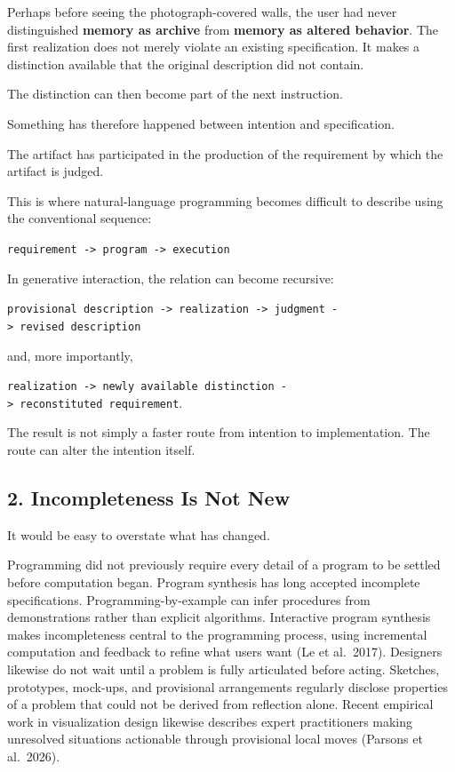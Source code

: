 \documentclass[
]{article}
\begin{document}
Perhaps before seeing the photograph-covered walls, the user had never
distinguished \textbf{memory as archive} from \textbf{memory as altered
behavior}. The first realization does not merely violate an existing
specification. It makes a distinction available that the original
description did not contain.

The distinction can then become part of the next instruction.

Something has therefore happened between intention and specification.

The artifact has participated in the production of the requirement by
which the artifact is judged.

This is where natural-language programming becomes difficult to describe
using the conventional sequence:

\texttt{requirement\ -\textgreater{}\ program\ -\textgreater{}\ execution}

In generative interaction, the relation can become recursive:

\texttt{provisional\ description\ -\textgreater{}\ realization\ -\textgreater{}\ judgment\ -\textgreater{}\ revised\ description}

and, more importantly,

\texttt{realization\ -\textgreater{}\ newly\ available\ distinction\ -\textgreater{}\ reconstituted\ requirement}.

The result is not simply a faster route from intention to
implementation. The route can alter the intention itself.

\subsection{2. Incompleteness Is Not
New}\label{incompleteness-is-not-new}

It would be easy to overstate what has changed.

Programming did not previously require every detail of a program to be
settled before computation began. Program synthesis has long accepted
incomplete specifications. Programming-by-example can infer procedures
from demonstrations rather than explicit algorithms. Interactive program
synthesis makes incompleteness central to the programming process, using
incremental computation and feedback to refine what users want (Le et
al.~2017). Designers likewise do not wait until a problem is fully
articulated before acting. Sketches, prototypes, mock-ups, and
provisional arrangements regularly disclose properties of a problem that
could not be derived from reflection alone. Recent empirical work in
visualization design likewise describes expert practitioners making
unresolved situations actionable through provisional local moves
(Parsons et al.~2026).
\end{document}
